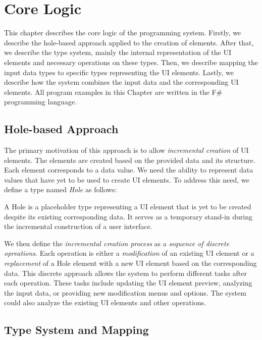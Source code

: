 \chapter{Core Logic}
\label{chap:corelogic}

This chapter describes the core logic of the programming system.
Firstly, we describe the hole-based approach applied to the creation of elements.
After that, we describe the type system, mainly the internal representation of the UI elements and necessary operations on these types.
Then, we describe mapping the input data types to specific types representing the UI elements.
Lastly, we describe how the system combines the input data and the corresponding UI elements.
All program examples in this Chapter are written in the F\# programming language.

\section{Hole-based Approach}
\label{sec:hole-based}
The primary motivation of this approach is to allow \emph{incremental creation} of UI elements.
The elements are created based on the provided data and its structure.
Each element corresponds to a data value.
We need the ability to represent data values that have yet to be used to create UI elements.
To address this need, we define a type named \emph{Hole} as follows:
\begin{defn}
	A Hole is a placeholder type representing a UI element that is yet to be created despite its existing corresponding data. It serves as a temporary stand-in during the incremental construction of a user interface.
\end{defn}

We then define the \emph{incremental creation process} as a \emph{sequence of discrete opreations}.
Each operation is either a \emph{modification} of an existing UI element or a \emph{replacement} of a Hole element with a new UI element based on the corresponding data.
This discrete approach allows the system to perform different tasks after each operation.
These tasks include updating the UI element preview, analyzing the input data, or providing new modification menus and options.
The system could also analyze the existing UI elements and other operations.


\section{Type System and Mapping}

